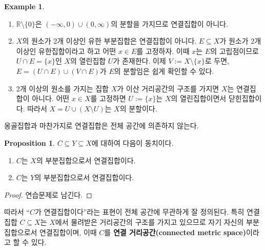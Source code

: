 \documentclass[11pt]{book}
\numberwithin{equation}{chapter}
\def\RR{\mathbb{R}}
\theoremstyle{definition}
\newtheorem{prop}[thm]{Proposition}
\newtheorem*{ex}{Example}
\newenvironment{enum}
	{\begin{enumerate}[label=(\alph*), leftmargin=2\parindent]}
	{\end{enumerate}}
\begin{document}
\begin{ex}
    \quad

    \begin{enum}
    \item \(\RR \setminus \{0\}\)은 \((-\infty, 0) \cup (0, \infty)\)의 분할을 가지므로 연결집합이 아니다.
    \item \(X\)의 원소가 2개 이상인 유한 부분집합은 연결집합이 아니다. \(E \subseteq X\)가 원소가 2개 이상인 유한집합이라고 하고 어떤 \(x \in E\)를 고정하자. 이때 \(x\)는 \(E\)의 고립점이므로 \(U \cap E = \{x\}\)인 \(X\)의 열린집합 \(U\)가 존재한다. 이제 \(V := X \setminus \{x\}\)로 두면, \(E = (U \cap E) \cup (V \cap E)\)가 \(E\)의 분할임은 쉽게 확인할 수 있다.
    \item 2개 이상의 원소를 가지는 집합 \(X\)가 이산 거리공간의 구조를 가지면 \(X\)는 연결집합이 아니다. 어떤 \(x \in X\)를 고정하면 \(U := \{x\}\)는 \(X\)의 열린집합이면서 닫힌집합이다. 따라서 \(X = U \cup (X \setminus U)\)는 \(X\)의 분할이다.
    \end{enum}
\end{ex}


옹골집합과 마찬가지로 연결집합은 전체 공간에 의존하지 않는다.

\begin{prop}
    \(C \subseteq Y \subseteq X\)에 대하여 다음이 동치이다.
    \begin{enum}
        \item \(C\)는 \(X\)의 부분집합으로서 연결집합이다.
        \item \(C\)는 \(Y\)의 부분집합으로서 연결집합이다.
    \end{enum}
\end{prop}
\begin{proof}
    연습문제로 남긴다.
\end{proof}

따라서 ``\(C\)가 연결집합이다''라는 표현이 전체 공간에 무관하게 잘 정의된다. 특히 연결집합 \(C \subseteq X\)는 \(X\)에서 물려받은 거리공간의 구조를 가지고 있으므로 자기 자신의 부분집합으로서 연결집합이며, 이때 \(C\)를 \textbf{연결 거리공간(connected metric space)}이라고 할 수 있다.
\end{document}
